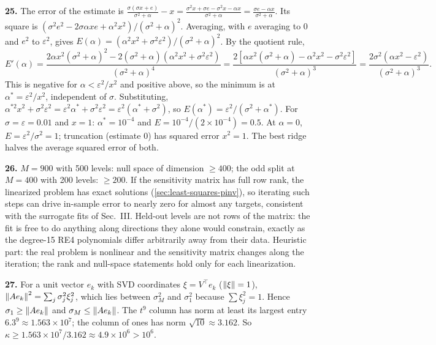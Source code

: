 \textbf{25.} The error of the estimate is $\frac{\sigma(\sigma x+e)}{\sigma^2+\alpha} - x = \frac{\sigma^2x+\sigma e-\sigma^2x-\alpha x}{\sigma^2+\alpha} = \frac{\sigma e-\alpha x}{\sigma^2+\alpha}$. Its square is $(\sigma^2e^2 - 2\sigma\alpha xe + \alpha^2x^2)/(\sigma^2+\alpha)^2$. Averaging, with $e$ averaging to $0$ and $e^2$ to $\varepsilon^2$, gives $E(\alpha) = (\alpha^2x^2+\sigma^2\varepsilon^2)/(\sigma^2+\alpha)^2$. By the quotient rule,
\[
E'(\alpha) = \frac{2\alpha x^2(\sigma^2+\alpha)^2 - 2(\sigma^2+\alpha)(\alpha^2x^2+\sigma^2\varepsilon^2)}{(\sigma^2+\alpha)^4} = \frac{2[\alpha x^2(\sigma^2+\alpha) - \alpha^2x^2 - \sigma^2\varepsilon^2]}{(\sigma^2+\alpha)^3} = \frac{2\sigma^2(\alpha x^2-\varepsilon^2)}{(\sigma^2+\alpha)^3}.
\]
This is negative for $\alpha<\varepsilon^2/x^2$ and positive above, so the minimum is at $\alpha^* = \varepsilon^2/x^2$, independent of $\sigma$. Substituting, $\alpha^{*2}x^2 + \sigma^2\varepsilon^2 = \varepsilon^2\alpha^* + \sigma^2\varepsilon^2 = \varepsilon^2(\alpha^*+\sigma^2)$, so $E(\alpha^*) = \varepsilon^2/(\sigma^2+\alpha^*)$. For $\sigma=\varepsilon=0.01$ and $x=1$: $\alpha^* = 10^{-4}$ and $E = 10^{-4}/(2\times10^{-4}) = 0.5$. At $\alpha = 0$, $E = \varepsilon^2/\sigma^2 = 1$; truncation (estimate $0$) has squared error $x^2 = 1$. The best ridge halves the average squared error of both.

\textbf{26.} $M = 900$ with 500 levels: null space of dimension $\ge400$; the odd split at $M = 400$ with 200 levels: $\ge200$. If the sensitivity matrix has full row rank, the linearized problem has exact solutions (\cref{sec:least-squares-pinv}), so iterating such steps can drive in-sample error to nearly zero for almost any targets, consistent with the surrogate fits of Sec.~III. Held-out levels are not rows of the matrix: the fit is free to do anything along directions they alone would constrain, exactly as the degree-15 RE4 polynomials differ arbitrarily away from their data. Heuristic part: the real problem is nonlinear and the sensitivity matrix changes along the iteration; the rank and null-space statements hold only for each linearization.

\textbf{27.} For a unit vector $e_k$ with SVD coordinates $\xi = V^\top e_k$ ($\left\lVert \xi\right\rVert = 1$), $\left\lVert Ae_k\right\rVert^2 = \sum_j\sigma_j^2\xi_j^2$, which lies between $\sigma_M^2$ and $\sigma_1^2$ because $\sum\xi_j^2 = 1$. Hence $\sigma_1\ge\left\lVert Ae_k\right\rVert$ and $\sigma_M\le\left\lVert Ae_k\right\rVert$. The $t^9$ column has norm at least its largest entry $6.3^9\approx1.563\times10^7$; the column of ones has norm $\sqrt{10}\approx3.162$. So $\kappa\ge1.563\times10^7/3.162\approx4.9\times10^6>10^6$.
